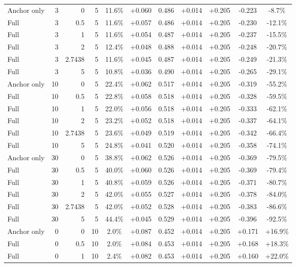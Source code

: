 \begin{table}[htbp]
\begin{tabular}{lrrrccccccc}
Anchor only & 3 & 0 & 5 & 11.6\% & +0.060 & 0.486 & +0.014 & +0.205 & -0.223 & -8.7\% \\
Full & 3 & 0.5 & 5 & 11.6\% & +0.057 & 0.486 & +0.014 & +0.205 & -0.230 & -12.1\% \\
Full & 3 & 1 & 5 & 11.6\% & +0.054 & 0.487 & +0.014 & +0.205 & -0.237 & -15.5\% \\
Full & 3 & 2 & 5 & 12.4\% & +0.048 & 0.488 & +0.014 & +0.205 & -0.248 & -20.7\% \\
Full & 3 & 2.7438 & 5 & 11.6\% & +0.045 & 0.487 & +0.014 & +0.205 & -0.249 & -21.3\% \\
Full & 3 & 5 & 5 & 10.8\% & +0.036 & 0.490 & +0.014 & +0.205 & -0.265 & -29.1\% \\
Anchor only & 10 & 0 & 5 & 22.4\% & +0.062 & 0.517 & +0.014 & +0.205 & -0.319 & -55.2\% \\
Full & 10 & 0.5 & 5 & 22.8\% & +0.058 & 0.518 & +0.014 & +0.205 & -0.328 & -59.5\% \\
Full & 10 & 1 & 5 & 22.0\% & +0.056 & 0.518 & +0.014 & +0.205 & -0.333 & -62.1\% \\
Full & 10 & 2 & 5 & 23.2\% & +0.052 & 0.518 & +0.014 & +0.205 & -0.337 & -64.1\% \\
Full & 10 & 2.7438 & 5 & 23.6\% & +0.049 & 0.519 & +0.014 & +0.205 & -0.342 & -66.4\% \\
Full & 10 & 5 & 5 & 24.8\% & +0.041 & 0.520 & +0.014 & +0.205 & -0.358 & -74.1\% \\
Anchor only & 30 & 0 & 5 & 38.8\% & +0.062 & 0.526 & +0.014 & +0.205 & -0.369 & -79.5\% \\
Full & 30 & 0.5 & 5 & 40.0\% & +0.060 & 0.526 & +0.014 & +0.205 & -0.369 & -79.4\% \\
Full & 30 & 1 & 5 & 40.8\% & +0.059 & 0.526 & +0.014 & +0.205 & -0.371 & -80.7\% \\
Full & 30 & 2 & 5 & 42.0\% & +0.055 & 0.527 & +0.014 & +0.205 & -0.378 & -84.0\% \\
Full & 30 & 2.7438 & 5 & 42.0\% & +0.052 & 0.528 & +0.014 & +0.205 & -0.383 & -86.6\% \\
Full & 30 & 5 & 5 & 44.4\% & +0.045 & 0.529 & +0.014 & +0.205 & -0.396 & -92.5\% \\
Anchor only & 0 & 0 & 10 & 2.0\% & +0.087 & 0.452 & +0.014 & +0.205 & +0.171 & +16.9\% \\
Full & 0 & 0.5 & 10 & 2.0\% & +0.084 & 0.453 & +0.014 & +0.205 & +0.168 & +18.3\% \\
Full & 0 & 1 & 10 & 2.4\% & +0.082 & 0.453 & +0.014 & +0.205 & +0.160 & +22.0\% \\

\end{tabular}
\end{table}
